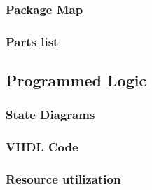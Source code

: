 \documentclass{article}
\begin{document}
    \subsubsection{Package Map}


    \subsubsection{Parts list}

  \subsection{Programmed Logic}

    \subsubsection{State Diagrams}

    \subsubsection{VHDL Code}

    \subsubsection{Resource utilization}
\end{document}
